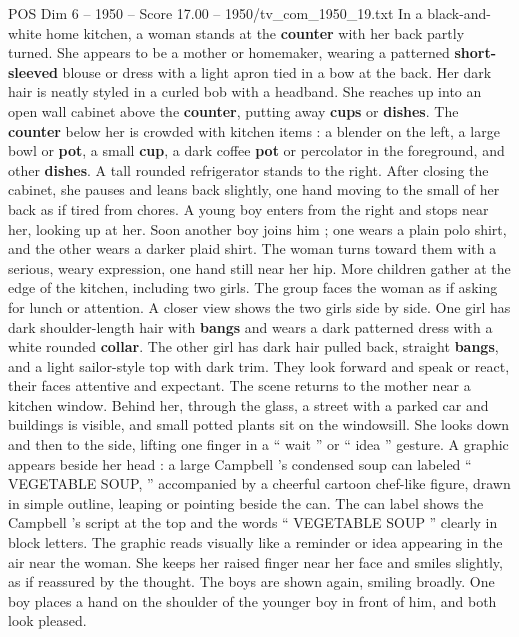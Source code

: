 \begin{textsample}{POS Dim 6 – 1950 – Score 17.00 – 1950/tv\_com\_1950\_19.txt}  \label{ex:f6_pos_003}
In a black-and-white home kitchen, a woman stands at the \textbf{counter} with her back partly turned.
She appears to be a mother or homemaker, wearing a patterned \textbf{short-sleeved} blouse or dress with a light apron tied in a bow at the back.
Her dark hair is neatly styled in a curled bob with a headband.
She reaches up into an open wall cabinet above the \textbf{counter}, putting away \textbf{cups} or \textbf{dishes}.
The \textbf{counter} below her is crowded with kitchen items : a blender on the left, a large bowl or \textbf{pot}, a small \textbf{cup}, a dark coffee \textbf{pot} or percolator in the foreground, and other \textbf{dishes}.
A tall rounded refrigerator stands to the right.
After closing the cabinet, she pauses and leans back slightly, one hand moving to the small of her back as if tired from chores.
A young boy enters from the right and stops near her, looking up at her.
Soon another boy joins him ; one wears a plain polo shirt, and the other wears a darker plaid shirt.
The woman turns toward them with a serious, weary expression, one hand still near her hip.
More children gather at the edge of the kitchen, including two girls.
The group faces the woman as if asking for lunch or attention.
A closer view shows the two girls side by side.
One girl has dark shoulder-length hair with \textbf{bangs} and wears a dark patterned dress with a white rounded \textbf{collar}.
The other girl has dark hair pulled back, straight \textbf{bangs}, and a light sailor-style top with dark trim.
They look forward and speak or react, their faces attentive and expectant.
The scene returns to the mother near a kitchen window.
Behind her, through the glass, a street with a parked car and buildings is visible, and small potted plants sit on the windowsill.
She looks down and then to the side, lifting one finger in a “ wait ” or “ idea ” gesture.
A graphic appears beside her head : a large Campbell ’s condensed soup can labeled “ VEGETABLE SOUP, ” accompanied by a cheerful cartoon chef-like figure, drawn in simple outline, leaping or pointing beside the can.
The can label shows the Campbell ’s script at the top and the words “ VEGETABLE SOUP ” clearly in block letters.
The graphic reads visually like a reminder or idea appearing in the air near the woman.
She keeps her raised finger near her face and smiles slightly, as if reassured by the thought.
The boys are shown again, smiling broadly.
One boy places a hand on the shoulder of the younger boy in front of him, and both look pleased.

\end{textsample}
